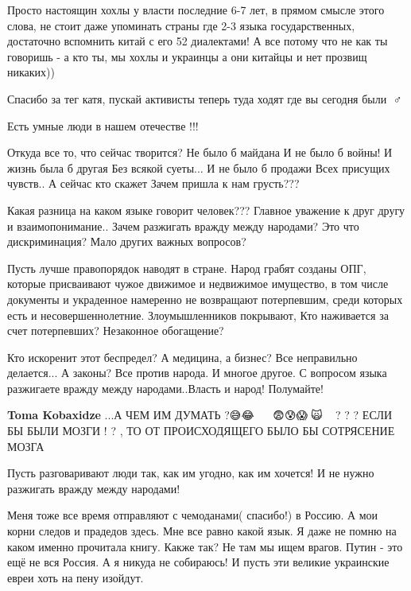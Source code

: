 \begin{itemize}
{
Просто настоящин хохлы у власти последние 6-7 лет, в прямом смысле этого слова,
не стоит даже упоминать страны где 2-3 языка государственных, достаточно
вспомнить китай с его 52 диалектами! А все потому что не как ты говоришь - а
кто ты, мы хохлы и украинцы а они китайцы и нет прозвищ никаких))

Спасибо за тег катя, пускай активисты теперь туда ходят где вы сегодня были 🤦♂️

Есть умные люди в нашем отечестве !!!

\obeycr
  Откуда все то, что сейчас творится?
  Не было б майдана
  И не было б войны!
  И жизнь была б другая
  Без всякой суеты...
  И не было б продажи
  Всех присущих чувств..
  А сейчас кто скажет
  Зачем пришла к нам грусть???
\restorecr


Какая разница на каком языке говорит человек??? Главное уважение к друг другу и
взаимопонимание.. Зачем разжигать вражду между народами? Это что дискриминация?
Мало других важных вопросов?

Пусть лучше правопорядок наводят в стране. Народ грабят созданы ОПГ, которые
присваивают чужое движимое и недвижимое имущество, в том числе документы и
украденное намеренно не возвращают потерпевшим, среди которых есть и
несовершеннолетние. Злоумышленников покрывают, Кто наживается за счет
потерпевших? Незаконное обогащение?

Кто искоренит этот беспредел? А медицина, а бизнес? Все неправильно делается...
А законы? Все против народа. И многое другое. С вопросом языка разжигаете
вражду между народами..Власть и народ! Полумайте!

\textbf{Toma Kobaxidze} ...А ЧЕМ ИМ ДУМАТЬ ?😅😂🤣🥵🥶🥸🧐🤯😨😰😱🤡🙀🙊🙉🙈 ? ? ?
ЕСЛИ БЫ БЫЛИ МОЗГИ ! ? , ТО ОТ ПРОИСХОДЯЩЕГО
БЫЛО БЫ СОТРЯСЕНИЕ МОЗГА


Пусть разговаривают люди так, как им угодно, как им хочется!  И не нужно
разжигать вражду между народами!


Меня тоже все время отправляют с чемоданами( спасибо!) в Россию. А мои корни
следов и прадедов здесь. Мне все равно какой язык. Я даже не помню на каком
именно прочитала книгу. Какже так? Не там мы ищем врагов. Путин - это ещё не
вся Россия. А я никуда не собираюсь! И пусть эти великие украинские евреи хоть
на пену изойдут.

}
\end{itemize}
